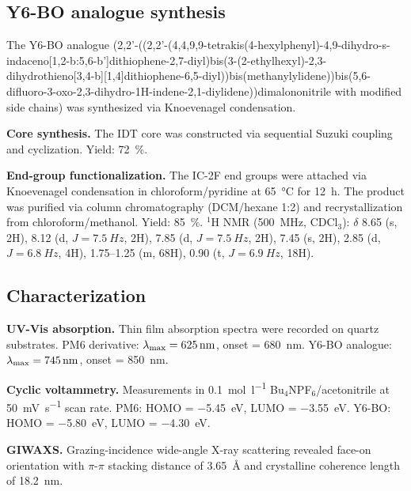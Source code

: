 \documentclass[11pt,a4paper]{article}
\begin{document}
\subsection{Y6-BO analogue synthesis}

The Y6-BO analogue (2,2'-((2,2'-(4,4,9,9-tetrakis(4-hexylphenyl)-4,9-dihydro-s-indaceno[1,2-b:5,6-b']dithiophene-2,7-diyl)bis(3-(2-ethylhexyl)-2,3-dihydrothieno[3,4-b][1,4]dithiophene-6,5-diyl))bis(methanylylidene))bis(5,6-difluoro-3-oxo-2,3-dihydro-1H-indene-2,1-diylidene))dimalononitrile with modified side chains) was synthesized via Knoevenagel condensation.

\textbf{Core synthesis.} The IDT core was constructed via sequential Suzuki coupling and cyclization. Yield: \SI{72}{\percent}.

\textbf{End-group functionalization.} The IC-2F end groups were attached via Knoevenagel condensation in chloroform/pyridine at \SI{65}{\degreeCelsius} for \SI{12}{\hour}. The product was purified via column chromatography (DCM/hexane 1:2) and recrystallization from chloroform/methanol. Yield: \SI{85}{\percent}. $^1$H NMR (\SI{500}{MHz}, CDCl$_3$): $\delta$ 8.65 (s, 2H), 8.12 (d, $J = \SI{7.5}{Hz}$, 2H), 7.85 (d, $J = \SI{7.5}{Hz}$, 2H), 7.45 (s, 2H), 2.85 (d, $J = \SI{6.8}{Hz}$, 4H), 1.75--1.25 (m, 68H), 0.90 (t, $J = \SI{6.9}{Hz}$, 18H).

\subsection{Characterization}

\textbf{UV-Vis absorption.} Thin film absorption spectra were recorded on quartz substrates. PM6 derivative: $\lambda_{\rm max} = \SI{625}{\nano\meter}$, onset = \SI{680}{\nano\meter}. Y6-BO analogue: $\lambda_{\rm max} = \SI{745}{\nano\meter}$, onset = \SI{850}{\nano\meter}.

\textbf{Cyclic voltammetry.} Measurements in \SI{0.1}{\mole\per\litre} Bu$_4$NPF$_6$/acetonitrile at \SI{50}{\milli\volt\per\second} scan rate. PM6: HOMO = \SI{-5.45}{\electronvolt}, LUMO = \SI{-3.55}{\electronvolt}. Y6-BO: HOMO = \SI{-5.80}{\electronvolt}, LUMO = \SI{-4.30}{\electronvolt}.

\textbf{GIWAXS.} Grazing-incidence wide-angle X-ray scattering revealed face-on orientation with $\pi$-$\pi$ stacking distance of \SI{3.65}{\angstrom} and crystalline coherence length of \SI{18.2}{\nano\meter}.

\end{document}
